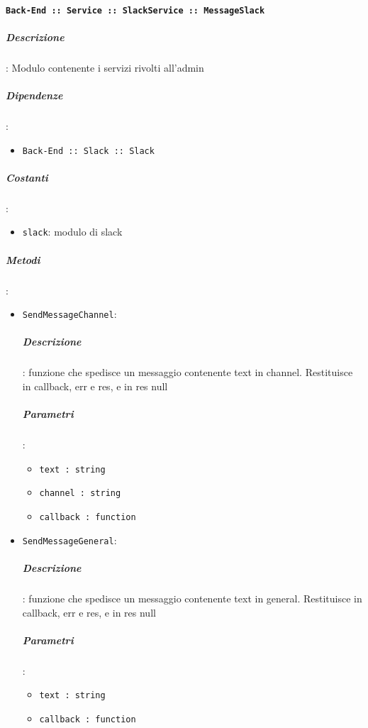 \documentclass[../DefinizioneDiProdotto_v3.0.0.tex]{subfiles}
\begin{document}
\paragraph{\texttt{Back-End :: Service :: SlackService :: MessageSlack}}
\subparagraph{Descrizione}: Modulo contenente i servizi rivolti all'admin
\subparagraph{Dipendenze}:
\begin{itemize}
	\item \texttt{Back-End :: Slack :: Slack}
\end{itemize}
\subparagraph{Costanti}:
\begin{itemize}
	\item \texttt{slack}: modulo di slack
\end{itemize}
\subparagraph{Metodi}:\begin{itemize}
\item \texttt{SendMessageChannel}:
\subparagraph{Descrizione}: funzione che spedisce un messaggio contenente text in channel. Restituisce in callback, err e res, e in res null
\subparagraph{Parametri}: \begin{itemize}
\item \texttt{text : string}
\item \texttt{channel : string}
\item \texttt{callback : function}
\end{itemize}
\item \texttt{SendMessageGeneral}:
\subparagraph{Descrizione}: funzione che spedisce un messaggio contenente text in general. Restituisce in callback, err e res, e in res null
\subparagraph{Parametri}: \begin{itemize}
\item \texttt{text : string}
\item \texttt{callback : function}
\end{itemize}
\end{itemize}

\newpage
\end{document}
